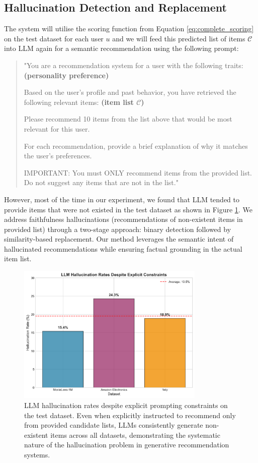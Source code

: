 \documentclass[acmsmall]{acmart}
\begin{document}
\subsection{Hallucination Detection and Replacement}
\label{sec:hallucination_mitigation}

The system will utilise the scoring function from Equation \ref{eq:complete_scoring} on the test dataset for each user $u$ and we will feed this predicted list of items $\mathcal{C}$ into LLM again for a semantic recommendation using the following prompt: 
\begin{quote}
"You are a recommendation system for a user with the following traits:
\textbf{        (personality preference)}
        
        Based on the user's profile and past behavior, you have retrieved the following relevant items:
\textbf{        (item list $\mathcal{C}$)}
        
        Please recommend 10 items from the list above that would be most relevant for this user.
        
        For each recommendation, provide a brief explanation of why it matches the user's preferences.
        
        IMPORTANT: You must ONLY recommend items from the provided list. Do not suggest any items that are not in the list."
\end{quote}
However, most of the time in our experiment, we found that LLM tended to provide items that were not existed in the test dataset as shown in Figure \ref{fig:llm_hallucination_evidence}. We address faithfulness hallucinations (recommendations of non-existent items in provided list) through a two-stage approach: binary detection followed by similarity-based replacement. Our method leverages the semantic intent of hallucinated recommendations while ensuring factual grounding in the actual item list.
\begin{figure}[h]
\centering
\includegraphics[width=0.8\textwidth]{llm_hallucination_evidence.png}
\caption{LLM hallucination rates despite explicit prompting constraints on the test dataset. Even when explicitly instructed to recommend only from provided candidate lists, LLMs consistently generate non-existent items across all datasets, demonstrating the systematic nature of the hallucination problem in generative recommendation systems.}
\label{fig:llm_hallucination_evidence}
\end{figure}
\end{document}
